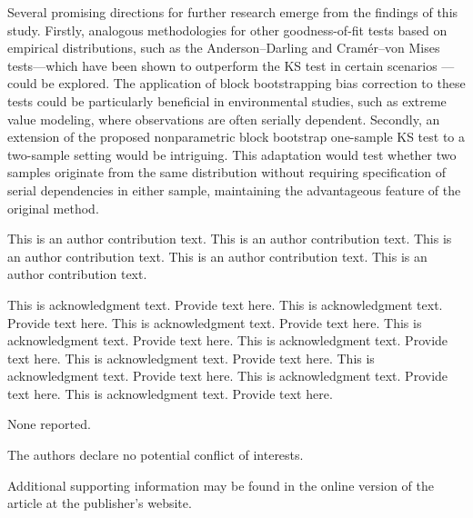 \documentclass[APA,Times1COL]{WileyNJDv5} %
\begin{document}
Several promising directions for further research emerge from the findings of
this study. Firstly, analogous methodologies for other goodness-of-fit tests
based on empirical distributions, such as the Anderson--Darling and Cramér--von
Mises tests---which have been shown to outperform the KS test in certain scenarios
\citep{stephens2017tests}---could be explored. The application of block
bootstrapping bias correction to these tests could be particularly beneficial in
environmental studies, such as extreme value modeling, where observations are
often serially dependent. Secondly, an extension of the proposed nonparametric
block bootstrap one-sample KS test to a two-sample setting would be
intriguing. This adaptation would test whether two samples originate from the
same distribution without requiring specification of serial dependencies in
either sample, maintaining the advantageous feature of the original method.


{}

This is an author contribution text. This is an author contribution text. This is an author contribution text. This is an author contribution text. This is an author contribution text.

This is acknowledgment text. Provide text here. This is acknowledgment text. Provide text here. This is acknowledgment text. Provide text here. This is acknowledgment text. Provide text here. This is acknowledgment text. Provide text here. This is acknowledgment text. Provide text here. This is acknowledgment text. Provide text here. This is acknowledgment text. Provide text here. This is acknowledgment text. Provide text here.



None reported.


The authors declare no potential conflict of interests.






Additional supporting information may be found in the
online version of the article at the publisher’s website.






\nocite{*}%
\end{document}
